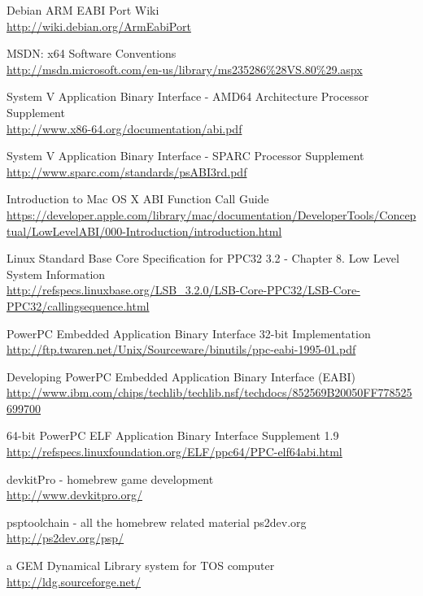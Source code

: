 \begin{thebibliography}{14}
	Debian ARM EABI Port Wiki\\
	\url{http://wiki.debian.org/ArmEabiPort}

	MSDN: x64 Software Conventions\\
	\url{http://msdn.microsoft.com/en-us/library/ms235286\%28VS.80\%29.aspx}

	System V Application Binary Interface - AMD64 Architecture Processor Supplement\\
	\url{http://www.x86-64.org/documentation/abi.pdf}

	System V Application Binary Interface - SPARC Processor Supplement\\
	\url{http://www.sparc.com/standards/psABI3rd.pdf}

	Introduction to Mac OS X ABI Function Call Guide\\
	\url{https://developer.apple.com/library/mac/documentation/DeveloperTools/Conceptual/LowLevelABI/000-Introduction/introduction.html}

	Linux Standard Base Core Specification for PPC32 3.2 - Chapter 8. Low Level System Information\\
	\url{http://refspecs.linuxbase.org/LSB\_3.2.0/LSB-Core-PPC32/LSB-Core-PPC32/callingsequence.html}

	PowerPC Embedded Application Binary Interface 32-bit Implementation\\
	\url{http://ftp.twaren.net/Unix/Sourceware/binutils/ppc-eabi-1995-01.pdf}

	Developing PowerPC Embedded Application Binary Interface (EABI)\\
	\url{http://www.ibm.com/chips/techlib/techlib.nsf/techdocs/852569B20050FF778525699700}

	64-bit PowerPC ELF Application Binary Interface Supplement 1.9\\
	\url{http://refspecs.linuxfoundation.org/ELF/ppc64/PPC-elf64abi.html}

	devkitPro - homebrew game development\\
	\url{http://www.devkitpro.org/}

	psptoolchain - all the homebrew related material ps2dev.org\\
	\url{http://ps2dev.org/psp/}

	a GEM Dynamical Library system for TOS computer\\
	\url{http://ldg.sourceforge.net/}


\end{thebibliography}
